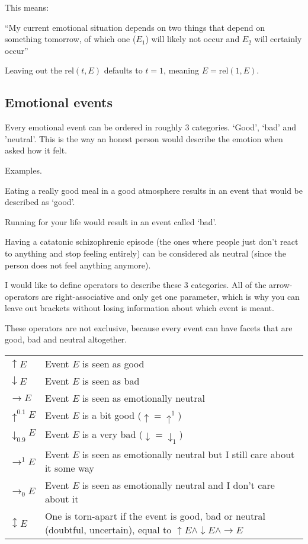 \documentclass{scrartcl}
\begin{document}
This means:

``My current emotional situation depends on two things that depend on something tomorrow, of which one ($E_1$) will likely not
occur and $E_2$ will certainly occur''

Leaving out the $\textrm{rel}(t, E)$ defaults to $t = 1$, meaning $E = \textrm{rel}(1, E)$.

\subsection{Emotional events}

Every emotional event can be ordered in roughly 3 categories. `Good', `bad' and 'neutral'. This is the way an honest
person would describe the emotion when asked how it felt. 

Examples.

Eating a really good meal in a good atmosphere results in an event that would be described as `good'. 

Running for your life would result in an event called `bad'.

Having a catatonic schizophrenic episode (the ones where people just don't react to anything and stop feeling entirely)
can be considered als neutral (since the person does not feel anything anymore).

I would like to define operators to describe these 3 categories. All of the arrow-operators are right-associative and
only get one parameter, which is why you can leave out brackets without losing information about which event is meant.

These operators are not exclusive, because every event can have facets that are good, bad and neutral altogether.

\begin{tabular}{l|l}
	$\uparrow E$ & Event $E$ is seen as good \\
	$\downarrow E$ & Event $E$ is seen as bad \\
	$\rightarrow E$ & Event $E$ is seen as emotionally neutral \\
	$\uparrow^{0.1} E$ & Event $E$ is a bit good ($\uparrow = \uparrow^1$) \\
	$\downarrow_{0.9} E$ & Event $E$ is a very bad ($\downarrow = \downarrow_1$) \\
	$\rightarrow^{1} E$ & Event $E$ is seen as emotionally neutral but I still care about it some way\footnotemark \\
	$\rightarrow_{0} E$ & Event $E$ is seen as emotionally neutral and I don't care about it\footnotemark\\
	$\updownarrow E$ & One is torn-apart if the event is good, bad or neutral (doubtful, uncertain), equal to $\uparrow E \wedge \downarrow E \wedge \rightarrow E$
\end{tabular}
\end{document}
